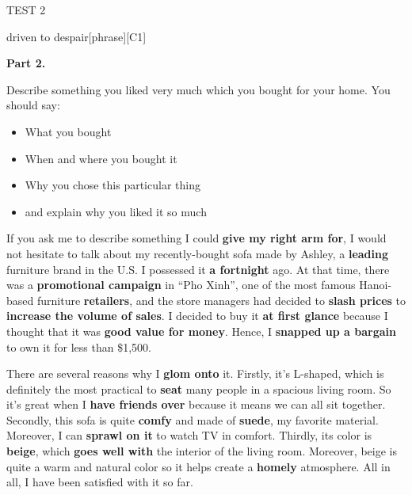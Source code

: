 \begin{glossarymc}[Cambridge 14]
\begin{test}{TEST 2}
\begin{VocabExplain}[Part 1]
            \begin{ExplainCard}{driven to despair}[phrase][C1]
            \end{ExplainCard}
        \end{VocabExplain}

    \noindent
    \textbf{Part 2.}
    \begin{qa}{Describe something you liked very much which you bought for your home. You should say:
    \begin{itemize}
        \item What you bought
        \item When and where you bought it
        \item Why you chose this particular thing
        \item and explain why you liked it so much
    \end{itemize}}

    If you ask me to describe something I could \textbf{give my right arm for}, I would not hesitate to talk about my recently-bought sofa made by Ashley, a \textbf{leading} furniture brand in the U.S. I possessed it \textbf{a fortnight} ago. At that time, there was a \textbf{promotional campaign} in “Pho Xinh”, one of the most famous Hanoi-based furniture \textbf{retailers}, and the store managers had decided to \textbf{slash prices} to \textbf{increase the volume of sales}. I decided to buy it \textbf{at first glance} because I thought that it was \textbf{good value for money}. Hence, I \textbf{snapped up a bargain} to own it for less than \$1,500. 

    There are several reasons why I \textbf{glom onto} it. Firstly, it’s L-shaped, which is definitely the most practical to \textbf{seat} many people in a spacious living room. So it’s great when I \textbf{have friends over} because it means we can all sit together. Secondly, this sofa is quite \textbf{comfy} and made of \textbf{suede}, my favorite material. Moreover, I can \textbf{sprawl on it} to watch TV in comfort. Thirdly, its color is \textbf{beige}, which \textbf{goes well with} the interior of the living room. Moreover, beige is quite a warm and natural color so it helps create a \textbf{homely} atmosphere. All in all, I have been satisfied with it so far.
    \end{qa}


\end{test}
\end{glossarymc}
